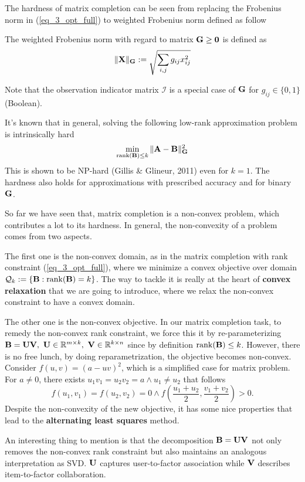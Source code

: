 \documentclass[../main.tex]{subfiles}
\begin{document}
\par The hardness of matrix completion can be seen from replacing the Frobenius norm in (\ref{eq_3_opt_full}) to weighted Frobenius norm defined as follow
\begin{definition}\label{def_3_wtd_f_norm}
	 The weighted Frobenius norm with regard to matrix ${\bf G}\geq {\bf 0}$ is defined as
	\begin{equation*}
	\|{\bf X}\|_{{\bf G}}:=\sqrt{\sum_{i,j}g_{ij}x_{ij}^2}
	\end{equation*}
\end{definition}
Note that the observation indicator matrix $\mathcal{I}$ is a special case of ${\bf G}$ for $g_{ij}\in\{0,1\}$ (Boolean).
\par It's known that in general, solving the following low-rank approximation problem is intrinsically hard
\begin{equation*}
\min_{{\rm rank}({\bf B})\leq k} \|{\bf A}-{\bf B}\|_{{\bf G}}^2
\end{equation*}
This is shown to be NP-hard (Gillis \& Glineur, 2011) even for $k=1$. The hardness also holds for approximations with prescribed accuracy and for binary ${\bf G}$.
\par So far we have seen that, matrix completion is a non-convex problem, which contributes a lot to its hardness. In general, the non-convexity of a problem comes from two aspects. 
\par The first one is the non-convex domain, as in the matrix completion with rank constraint (\ref{eq_3_opt_full}), where we minimize a convex objective over domain $\mathcal{Q}_k:=\{{\bf B}:{\rm rank}({\bf B})=k\}$. The way to tackle it is really at the heart of \textbf{convex relaxation} that we are going to introduce, where we relax the non-convex constraint to have a convex domain.
\par The other one is the non-convex objective. In our matrix completion task, to remedy the non-convex rank constraint, we force this it by re-parameterizing ${\bf B}={\bf UV},\ {\bf U}\in \mathbb{R}^{m\times k},\ {\bf V}\in \mathbb{R}^{k\times n}$ since by definition ${\rm rank}({\bf B})\leq k$. However, there is no free lunch, by doing reparametrization, the objective becomes non-convex. Consider $f(u, v) = (a-uv)^2$, which is a simplified case for matrix problem. For $a\neq 0$, there exists $u_1v_1=u_2v_2=a \land u_1\neq u_2$ that follows
\begin{equation*}
f(u_1,v_1)=f(u_2,v_2)=0\land f(\frac{u_1+u_2}{2},\frac{v_1+v_2}{2})>0.
\end{equation*}
Despite the non-convexity of the new objective, it has some nice properties that lead to the \textbf{alternating least squares} method.
\begin{remark}
	An interesting thing to mention is that the decomposition ${\bf B} = {\bf UV}$ not only removes the non-convex rank constraint but also maintains an analogous interpretation as SVD. ${\bf U}$ captures user-to-factor association while ${\bf V}$ describes item-to-factor collaboration.
\end{remark}
\end{document}
